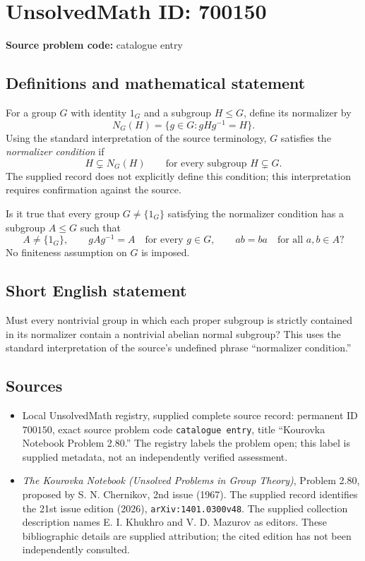 \documentclass[11pt]{article}
\begin{document}
\section*{UnsolvedMath ID: 700150}
\textbf{Source problem code:} catalogue entry
\subsection{Definitions and mathematical statement}
For a group \(G\) with identity \(1_G\) and a subgroup \(H\leq G\), define its normalizer by
\[
N_G(H)=\{g\in G:gHg^{-1}=H\}.
\]
Using the standard interpretation of the source terminology, \(G\) satisfies the \emph{normalizer condition} if
\[
H\subsetneq N_G(H)\qquad\text{for every subgroup }H\subsetneq G.
\]
The supplied record does not explicitly define this condition; this interpretation requires confirmation against the source.

Is it true that every group \(G\neq\{1_G\}\) satisfying the normalizer condition has a subgroup \(A\leq G\) such that
\[
A\neq\{1_G\},\qquad
 gAg^{-1}=A\quad\text{for every }g\in G,\qquad
 ab=ba\quad\text{for all }a,b\in A?
\]
No finiteness assumption on \(G\) is imposed.
\subsection{Short English statement}
Must every nontrivial group in which each proper subgroup is strictly contained in its normalizer contain a nontrivial abelian normal subgroup? This uses the standard interpretation of the source's undefined phrase ``normalizer condition.''
\subsection{Sources}
\begin{itemize}
\item Local UnsolvedMath registry, supplied complete source record: permanent ID \(700150\), exact source problem code \texttt{catalogue entry}, title ``Kourovka Notebook Problem 2.80.'' The registry labels the problem open; this label is supplied metadata, not an independently verified assessment.
\item \emph{The Kourovka Notebook (Unsolved Problems in Group Theory)}, Problem 2.80, proposed by S. N. Chernikov, 2nd issue (1967). The supplied record identifies the 21st issue edition (2026), \texttt{arXiv:1401.0300v48}. The supplied collection description names E. I. Khukhro and V. D. Mazurov as editors. These bibliographic details are supplied attribution; the cited edition has not been independently consulted.
\end{itemize}
\end{document}
